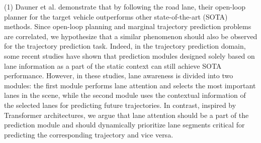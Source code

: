 \noindent(1) Dauner et al. \cite{dauner2023parting} demonstrate that by following the road lane, their open-loop planner for the target vehicle outperforms other state-of-the-art (SOTA) methods. Since open-loop planning and marginal trajectory prediction problems are correlated, we hypothesize that a similar phenomenon should also be observed for the trajectory prediction task. Indeed, in the trajectory prediction domain, some recent studies \cite{kim2021lapred,wang2022ltp,liu2024laformer} have shown that prediction modules designed solely based on lane information as a part of the static context can still achieve SOTA performance. However, in these studies, lane awareness is divided into two modules: the first module performs lane attention and selects the most important lanes in the scene, while the second module uses the contextual information of the selected lanes for predicting future trajectories. In contrast, inspired by Transformer architectures, we argue that lane attention should be a part of the prediction module and should dynamically prioritize lane segments critical for predicting the corresponding trajectory and vice versa. 


